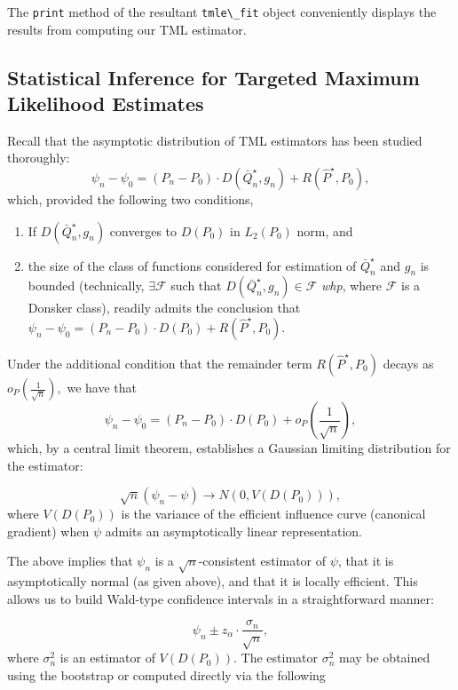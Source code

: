 \documentclass[12pt, krantz2,]{krantz}
\newcommand{\passthrough}[1]{#1}
\providecommand{\tightlist}{%
  \setlength{\itemsep}{0pt}\setlength{\parskip}{0pt}}
\theoremstyle{definition}
\theoremstyle{definition}
\theoremstyle{definition}
\newcommand{\1}{\mathbbm{1}}
\begin{document}
The \passthrough{\lstinline!print!} method of the resultant \passthrough{\lstinline!tmle\_fit!} object conveniently displays the
results from computing our TML estimator.

\hypertarget{statistical-inference-for-targeted-maximum-likelihood-estimates}{%
\subsection{Statistical Inference for Targeted Maximum Likelihood Estimates}\label{statistical-inference-for-targeted-maximum-likelihood-estimates}}

Recall that the asymptotic distribution of TML estimators has been studied
thoroughly:
\[\psi_n - \psi_0 = (P_n - P_0) \cdot D(\bar{Q}_n^{\star}, g_n) +
R(\hat{P}^{\star}, P_0),\]
which, provided the following two conditions,

\begin{enumerate}
\def\labelenumi{\arabic{enumi}.}
\tightlist
\item
  If \(D(\bar{Q}_n^{\star}, g_n)\) converges to \(D(P_0)\) in \(L_2(P_0)\) norm, and
\item
  the size of the class of functions considered for estimation of
  \(\bar{Q}_n^{\star}\) and \(g_n\) is bounded (technically, \(\exists \mathcal{F}\)
  such that \(D(\bar{Q}_n^{\star}, g_n) \in \mathcal{F}\) \emph{whp}, where
  \(\mathcal{F}\) is a Donsker class),
  readily admits the conclusion that
  \(\psi_n - \psi_0 = (P_n - P_0) \cdot D(P_0) + R(\hat{P}^{\star}, P_0)\).
\end{enumerate}

Under the additional condition that the remainder term \(R(\hat{P}^{\star}, P_0)\)
decays as \(o_P \left( \frac{1}{\sqrt{n}} \right),\) we have that
\[\psi_n - \psi_0 = (P_n - P_0) \cdot D(P_0) + o_P \left( \frac{1}{\sqrt{n}}
\right),\]
which, by a central limit theorem, establishes a Gaussian limiting distribution
for the estimator:

\[\sqrt{n}(\psi_n - \psi) \to N(0, V(D(P_0))),\]
where \(V(D(P_0))\) is the variance of the efficient influence curve (canonical
gradient) when \(\psi\) admits an asymptotically linear representation.

The above implies that \(\psi_n\) is a \(\sqrt{n}\)-consistent estimator of \(\psi\),
that it is asymptotically normal (as given above), and that it is locally
efficient. This allows us to build Wald-type confidence intervals in a
straightforward manner:

\[\psi_n \pm z_{\alpha} \cdot \frac{\sigma_n}{\sqrt{n}},\]
where \(\sigma_n^2\) is an estimator of \(V(D(P_0))\). The estimator \(\sigma_n^2\)
may be obtained using the bootstrap or computed directly via the following
\end{document}

